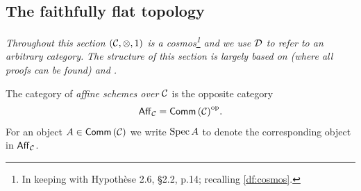 
\subsection{The faithfully flat topology} %
\label{sub:the_faithfully_flat_topology}

    \emph{Throughout this section $(\mathcal{C},\otimes,1)$ is a cosmos\footnote{
            In keeping with Hypothèse 2.6, \S2.2, p.14; recalling \cref{df:cosmos}.
        } and we use $\mathcal{D}$ to refer to an arbitrary category.}
    \emph{The structure of this section is largely based on \cite[\S1.2,~1.3]{Marty:2009tj} (where all proofs can be found) and \cite[\S1.1]{Toen:2008wy}.}

    \begin{definition}\label{df:old-affine-schemes}
        The category of \emph{affine schemes over $\mathcal{C}$} is the opposite category
        \begin{equation*}
            \mathsf{Aff}_{\mathcal{C}}={\mathsf{Comm}\left({\mathcal{C}}\right)}^{\mathrm{op}}.
        \end{equation*}
        For an object $A\in\mathsf{Comm}\left({\mathcal{C}}\right)$ we write $\operatorname{Spec} A$ to denote the corresponding object in $\mathsf{Aff}_{\mathcal{C}}$.
    \end{definition}



